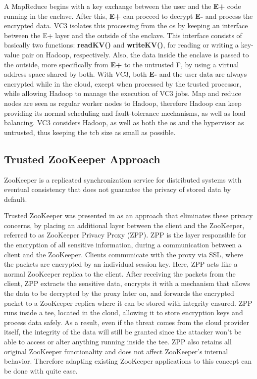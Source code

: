A MapReduce begins with a key exchange between the user and the \textbf{E+} code running in the enclave. After this, \textbf{E+} can proceed to decrypt \textbf{E-} and process the encrypted data. VC3 isolates this processing from the \gls{os} by keeping an interface between the E+ layer and the outside of the enclave. This interface consists of basically two functions: \textbf{readKV()} and \textbf{writeKV()}, for reading or writing a key-value pair on Hadoop, respectively. Also, the data inside the enclave is passed to the outside, more specifically from \textbf{E+} to the untrusted F, by using a virtual address space shared by both.
With VC3, both \textbf{E-} and the user data are always encrypted while in the cloud, except when processed by the trusted processor, while allowing Hadoop to manage the execution of VC3 jobs. Map and reduce nodes are seen as regular worker nodes to Hadoop, therefore Hadoop can keep providing its normal scheduling and fault-tolerance mechanisms, as well as load balancing. VC3 considers Hadoop, as well as both the \gls{os} and the hypervisor as untrusted, thus keeping the \gls{tcb} size as small as possible.

\subsection{Trusted ZooKeeper Approach}
\label{ssec:protected_zookeeper}

ZooKeeper \cite{zookeeper} is a replicated synchronization service for distributed systems with eventual consistency that does not guarantee the privacy of stored data by default. 

Trusted ZooKeeper was presented in \cite{protectedZooKeeper} as an approach that eliminates these privacy concerns, by placing an additional layer between the client and the ZooKeeper, referred to as ZooKeeper Privacy Proxy (ZPP). ZPP is the layer responsible for the encryption of all sensitive information, during a communication between a client and the ZooKeeper. 
Clients communicate with the proxy via SSL, where the packets are encrypted by an individual session key. Here, ZPP acts like a normal ZooKeeper replica to the client. 
After receiving the packets from the client, ZPP extracts the sensitive data, encrypts it with a mechanism that allows the data to be decrypted by the proxy later on, and forwards the encrypted packet to a ZooKeeper replica where it can be stored with integrity ensured.
ZPP runs inside a \gls{tee}, located in the cloud, allowing it to store encryption keys and process data safely. As a result, even if the threat comes from the cloud provider itself, the integrity of the data will still be granted since the attacker won't be able to access or alter anything running inside the \gls{tee}.
ZPP also retains all original ZooKeeper functionality and does not affect ZooKeeper's internal behavior. Therefore adapting existing ZooKeeper applications to this concept can be done with quite ease.

